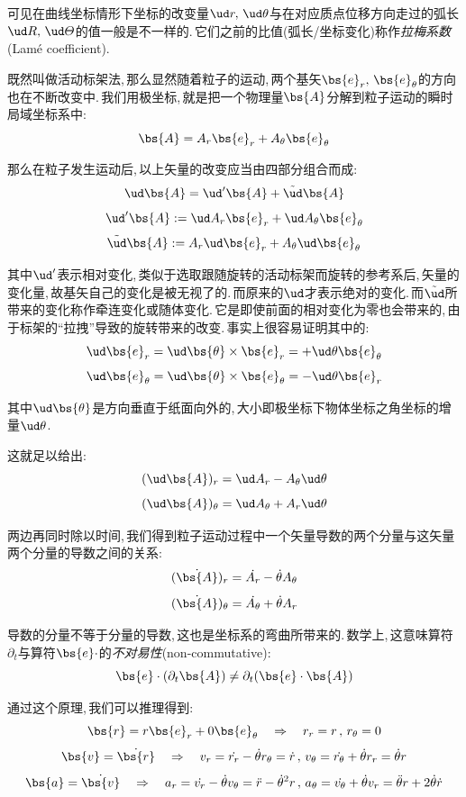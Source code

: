 可见在曲线坐标情形下坐标的改变量$\ud r,\,\ud \theta$与在对应质点位移方向走过的弧长$\ud R,\,\ud \varTheta$的值一般是不一样的.\,它们之前的比值(弧长/坐标变化)称作\emph{拉梅系数}(Lam\'e coefficient).

\vspace{0.5cm}
既然叫做活动标架法,\,那么显然随着粒子的运动,\,两个基矢$\bs{e}_r,\,\bs{e}_\theta$的方向也在不断改变中.\,我们用极坐标,\,就是把一个物理量$\bs{A}$分解到粒子运动的瞬时局域坐标系中:
\[\bs{A}=A_r\bs{e}_r+A_\theta\bs{e}_\theta\]

那么在粒子发生运动后,\,以上矢量的改变应当由四部分组合而成:
\[\ud \bs{A}=\ud'\bs{A}+\tilde{\ud}\bs{A} \]
\[\ud' \bs{A}:=\ud A_r\bs{e}_r+\ud A_\theta\bs{e}_\theta\]
\[\tilde{\ud}\bs{A}:= A_r\ud\bs{e}_r+ A_\theta\ud\bs{e}_\theta\]

其中$\ud'$表示相对变化,\,类似于选取跟随旋转的活动标架而旋转的参考系后,\,矢量的变化量,\,故基矢自己的变化是被无视了的.\,而原来的$\ud$才表示绝对的变化.\,而$\tilde{\ud}$所带来的变化称作牵连变化或随体变化.\,它是即使前面的相对变化为零也会带来的,\,由于标架的``拉拽''导致的旋转带来的改变.\,事实上很容易证明其中的:
\[\ud \bs{e}_r=\ud \bs{\theta}\times \bs{e}_r=+\ud \theta \bs{e}_\theta\]
\[\ud \bs{e}_\theta=\ud \bs{\theta}\times \bs{e}_\theta=-\ud \theta \bs{e}_r\]

其中$\ud \bs{\theta}$是方向垂直于纸面向外的,\,大小即极坐标下物体坐标之角坐标的增量$\ud \theta$.

这就足以给出:
\[(\ud \bs{A})_r=\ud A_r-A_\theta \ud \theta\]
\[(\ud \bs{A})_\theta=\ud A_\theta+A_r \ud \theta\]

两边再同时除以时间,\,我们得到粒子运动过程中一个矢量导数的两个分量与这矢量两个分量的导数之间的关系:
\[(\dot{\bs{A}})_r=\dot{A_r}-\dot{\theta}A_\theta\]
\[(\dot{\bs{A}})_\theta=\dot{A_\theta}+\dot{\theta}A_r\]

导数的分量不等于分量的导数,\,这也是坐标系的弯曲所带来的.\,数学上,\,这意味算符$\partial_t$与算符$\bs{e}\cdot$的\emph{不对易性}(non-commutative):
\[\bs{e}\cdot(\partial_t \bs{A})\neq \partial_t(\bs{e}\cdot \bs{A})\]

通过这个原理,\,我们可以推理得到:
\[\bs{r}=r\bs{e}_r+0\bs{e}_\theta\quad \Rightarrow\quad r_r=r\,,\,r_\theta=0\]
\[\bs{v}=\dot{\bs{r}}\quad \Rightarrow\quad  v_r=\dot{r_r}-\dot{\theta}r_\theta=\dot{r}\,,\,v_\theta=\dot{r_\theta}+\dot{\theta}r_r=\dot{\theta}r\]
\[\bs{a}=\dot{\bs{v}}\quad \Rightarrow\quad  a_r=\dot{v_r}-\dot{\theta}v_\theta=\ddot{r}-\dot{\theta}^2r\,,\,a_\theta=\dot{v_\theta}+\dot{\theta}v_r=\ddot{\theta}r+2\dot{\theta}\dot{r}\]

